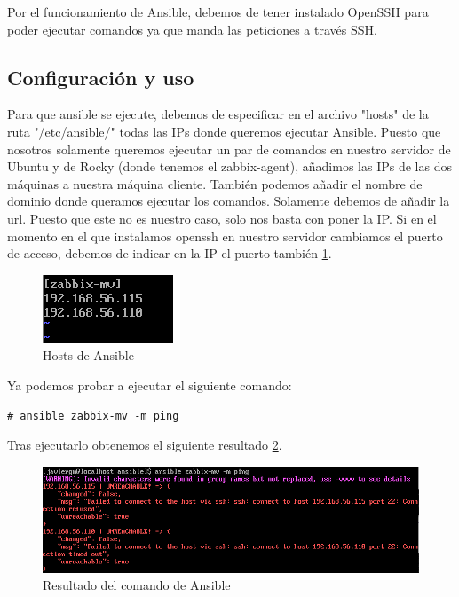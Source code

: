 Por el funcionamiento de Ansible, debemos de tener instalado OpenSSH para poder ejecutar comandos ya que manda las peticiones a través SSH. 

\newpage
\subsection{Configuración y uso}

Para que ansible se ejecute, debemos de especificar en el archivo "hosts" de la ruta "/etc/ansible/" todas las IPs donde queremos ejecutar Ansible. Puesto que nosotros solamente queremos ejecutar un par de comandos en nuestro servidor de Ubuntu y de Rocky (donde tenemos el zabbix-agent), añadimos las IPs de las dos máquinas a nuestra máquina cliente. También podemos añadir el nombre de dominio donde queramos ejecutar los comandos. Solamente debemos de añadir la url. Puesto que este no es nuestro caso, solo nos basta con poner la IP. Si en el momento en el que instalamos openssh en nuestro servidor cambiamos el puerto de acceso, debemos de indicar en la IP el puerto también \ref{fig:ansible-hosts}.

\begin{figure}[H]
  \centering
  \includegraphics{Captura20}
  \caption{Hosts de Ansible}
  \label{fig:ansible-hosts}
\end{figure}

Ya podemos probar a ejecutar el siguiente comando:

\begin{lstlisting}
# ansible zabbix-mv -m ping
\end{lstlisting}

Tras ejecutarlo obtenemos el siguiente resultado \ref{fig:ansible-prueba}.

\begin{figure}[H]
  \centering
  \includegraphics[scale=0.8]{Captura21}
  \caption{Resultado del comando de Ansible}
  \label{fig:ansible-prueba}
\end{figure}


